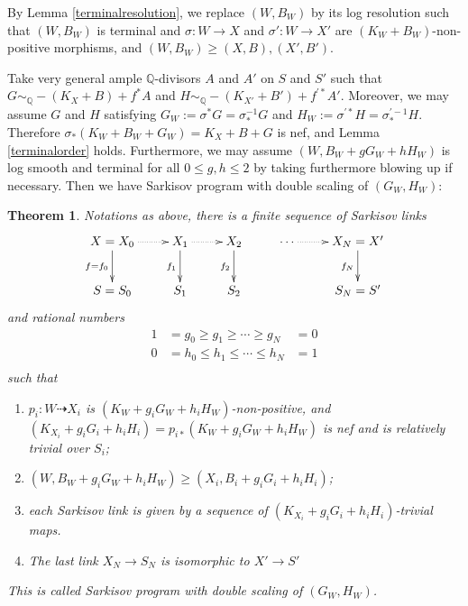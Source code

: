 \documentclass{article}
\newtheorem{thm}[defn]{Theorem}
\begin{document}
By Lemma \ref{terminalresolution}, we  replace $(W,B_W)$ by its log resolution such that $(W,B_{W})$ is terminal and $\sigma:W\to X$ and $\sigma':W\to X'$ are $(K_W+B_W)$-non-positive morphisms, and $(W,B_W)\geqslant (X,B),(X',B')$. 

Take  very general ample $\mathbb{Q}$-divisors $ A $ and $ A' $ on $ S $ and $ S' $ such that $ G\sim_{\mathbb{Q}}-(K_X+B)+f^*A $ and $ H\sim_{\mathbb{Q}}-(K_{X'}+B')+f^{'*}A' $. Moreover, we may assume $ G $ and $ H $ satisfying $G_{W}:= \sigma^*G=\sigma^{-1}_*G $ and $ H_{W}:=\sigma^{'*}H=\sigma^{'-1}_*H $. Therefore $\sigma_{*}(K_{W}+B_{W}+G_{W})=K_{X}+B+G$ is nef, and Lemma \ref{terminalorder} holds.
Furthermore, we may assume $(W,B_W+gG_W+hH_W)$ is log smooth and terminal for all $0\leqslant g,h\leqslant 2$ by taking furthermore blowing up if necessary.
Then we have Sarkisov program with double scaling of $(G_{W},H_{W})$: 
\begin{thm}\label{main2}
Notations as above, there is a finite sequence of Sarkisov links
\[
  \xymatrix{
    X=X_0\ar@{.>}[r]\ar[d]_{f=f_{0}}&X_{1}\ar@{.>}[r]\ar[d]_{f_{1}}& X_{2}\ar[d]_{f_{2}} &\cdots\ar@{.>}[r]&X_N=X'\ar[d]_{f_{N}} \\
    S=S_{0}&S_{1} &S_{2}&&S_N=S'
  }
\]
and rational numbers
\[
  \begin{aligned}
    1&=g_0\geqslant g_1 \geqslant \cdots \geqslant g_N&=0\\
    0&=h_0\leqslant h_{1} \leqslant \cdots \leqslant h_N&=1\\
  \end{aligned}
\]
such that 
\begin{enumerate}
  \item $p_i:W\dashrightarrow  X_{i}$ is $(K_{W}+g_{i}G_{W}+h_{i}H_{W})$-non-positive, and $(K_{X_{i}}+g_{i}G_{i}+h_{i}H_{i})=p_{i*}(K_{W}+g_{i}G_{W}+h_{i}H_{W})$ is nef and is relatively trivial over $S_{i}$;
  \item $(W,B_{W}+g_{i}G_{W}+h_{i}H_{W})\geqslant (X_{i},B_{i}+g_{i}G_{i}+h_{i}H_{i})$;
  \item each Sarkisov link is given by a sequence of $(K_{X_{i}}+g_{i}G_{i}+h_{i}H_{i})$-trivial maps.
    \item  The last link $X_{N} \to S_{N}$ is isomorphic to $X'\to S'$
\end{enumerate}
This is called Sarkisov program with double scaling of $(G_{W},H_{W})$.
\end{thm}
\end{document}
